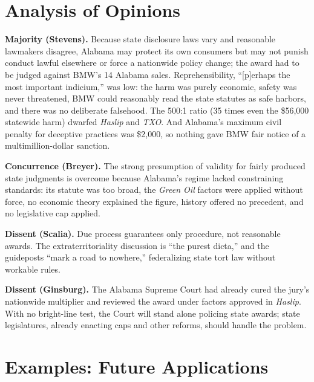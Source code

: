 \documentclass[12pt]{article}
\begin{document}
\section{Analysis of Opinions}

\textbf{Majority (Stevens).} Because state disclosure laws vary and reasonable lawmakers disagree, Alabama may protect its own consumers but may not punish conduct lawful elsewhere or force a nationwide policy change; the award had to be judged against BMW's 14 Alabama sales. Reprehensibility, ``[p]erhaps the most important indicium,'' was low: the harm was purely economic, safety was never threatened, BMW could reasonably read the state statutes as safe harbors, and there was no deliberate falsehood. The 500:1 ratio (35 times even the \$56,000 statewide harm) dwarfed \textit{Haslip} and \textit{TXO}. And Alabama's maximum civil penalty for deceptive practices was \$2,000, so nothing gave BMW fair notice of a multimillion-dollar sanction.

\textbf{Concurrence (Breyer).} The strong presumption of validity for fairly produced state judgments is overcome because Alabama's regime lacked constraining standards: its statute was too broad, the \textit{Green Oil} factors were applied without force, no economic theory explained the figure, history offered no precedent, and no legislative cap applied.

\textbf{Dissent (Scalia).} Due process guarantees only procedure, not reasonable awards. The extraterritoriality discussion is ``the purest dicta,'' and the guideposts ``mark a road to nowhere,'' federalizing state tort law without workable rules.

\textbf{Dissent (Ginsburg).} The Alabama Supreme Court had already cured the jury's nationwide multiplier and reviewed the award under factors approved in \textit{Haslip}. With no bright-line test, the Court will stand alone policing state awards; state legislatures, already enacting caps and other reforms, should handle the problem.

\section{Examples: Future Applications}
\end{document}
